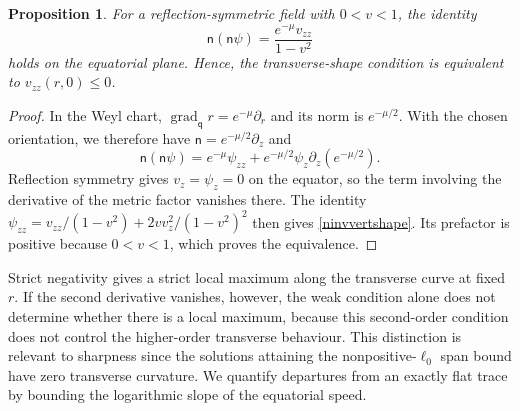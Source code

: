 \documentclass[amsmath,amsfonts,amssymb,aps,pra,superscriptaddress,10pt]{revtex4-2}
\numberwithin{equation}{section}
\theoremstyle{plain}
\newtheorem{proposition}{Proposition}
\theoremstyle{definition}
\theoremstyle{remark}
\theoremstyle{definition}
\newcommand{\ellzero}{\ell_0}
\begin{document}
\begin{proposition}
For a reflection-symmetric field with $0<v<1$, the identity
\begin{equation}\label{ninvvertshape}
\mathsf{n}(\mathsf{n}\psi)=\frac{e^{-\mu} v_{zz}}{1-v^2}
\end{equation}
holds on the equatorial plane. Hence, the transverse-shape condition is equivalent to $v_{zz}(r,0)\leq 0$.
\end{proposition}

\begin{proof}
In the Weyl chart, $\operatorname{grad}_{\mathsf{q}}r=e^{-\mu}\partial_r$ and its norm is $e^{-\mu/2}$. With the chosen orientation, we therefore have $\mathsf{n}=e^{-\mu/2}\partial_z$ and
\begin{equation}
\mathsf{n}(\mathsf{n}\psi)=e^{-\mu}\psi_{zz}+e^{-\mu/2}\psi_z\partial_z(e^{-\mu/2}).
\end{equation}
Reflection symmetry gives $v_z=\psi_z=0$ on the equator, so the term involving the derivative of the metric factor vanishes there. The identity $\psi_{zz}=v_{zz}/(1-v^2)+2v v_z^2/(1-v^2)^2$ then gives \eqref{ninvvertshape}. Its prefactor is positive because $0<v<1$, which proves the equivalence.
\end{proof}

Strict negativity gives a strict local maximum along the transverse curve at fixed $r$. If the second derivative vanishes, however, the weak condition alone does not determine whether there is a local maximum, because this second-order condition does not control the higher-order transverse behaviour. This distinction is relevant to sharpness since the solutions attaining the nonpositive-$\ellzero$ span bound have zero transverse curvature. We quantify departures from an exactly flat trace by bounding the logarithmic slope of the equatorial speed.
\end{document}
